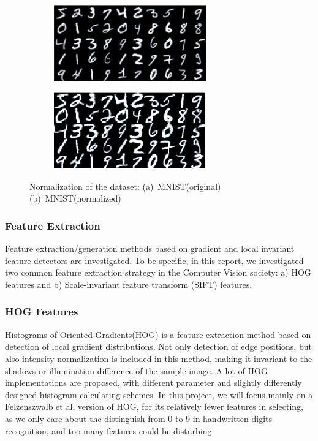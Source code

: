 \documentclass[12pt]{article}
\begin{document}
\begin{figure}[tbp]
	\centering
	\begin{subfigure}{.45\textwidth}
		\includegraphics[height = 1.3in]{MNIST}		
		\caption{ }
	\end{subfigure}
	\begin{subfigure}{.45\textwidth}
		\includegraphics[height = 1.3in]{MNIST_norm}		
		\caption{ }
	\end{subfigure}
	\caption{Normalization of the dataset: (a)~MNIST(original) (b)~MNIST(normalized)}
	\label{fig:norm}
\end{figure}

\subsubsection{Feature Extraction}
Feature extraction/generation methods based on gradient and local invariant feature detectors are investigated. To be specific, in this report, we investigated two common feature extraction strategy in the Computer Vision society: a) HOG features and b) Scale-invariant feature transform (SIFT) features.

\subsubsection*{HOG Features}
 Histograms of Oriented Gradients(HOG)\cite{dalal2005histograms}\cite{felzenszwalb2010object} is a feature extraction method based on detection of local gradient distributions. Not only detection of edge positions, but also intensity normalization is included in this method, making it invariant to the shadows or illumination difference of the sample image. A lot of HOG implementations are proposed, with different parameter and slightly differently designed histogram calculating schemes. In this project, we will focus mainly on a Felzenszwalb et al.\cite{felzenszwalb2010object} version of HOG, for its relatively fewer features in selecting, as we only care about the distinguish from 0 to 9 in handwritten digits recognition, and too many features could be disturbing.
\end{document}
